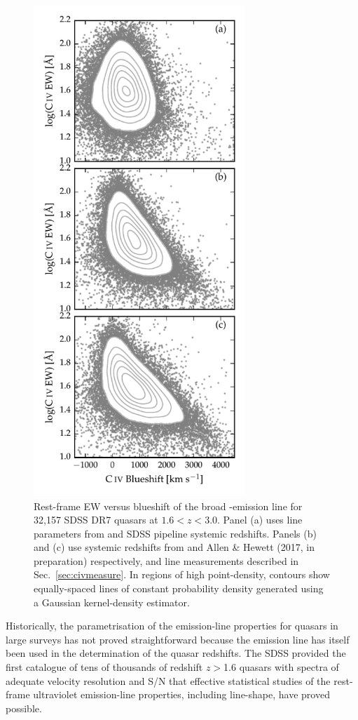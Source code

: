 \begin{figure}
    \includegraphics[width=8cm]{figures/chapter02/civ_space.pdf}
    \caption{Rest-frame EW versus blueshift of the broad -emission line for 32,157 SDSS DR7 quasars at $1.6 < z < 3.0$. Panel (a) uses  line parameters from \citet{shen11} and SDSS pipeline systemic redshifts. Panels (b) and (c) use systemic redshifts from \citet{hewett10} and Allen \& Hewett (2017, in preparation) respectively, and  line measurements described in Sec.~\ref{sec:civmeasure}. In regions of high point-density, contours show equally-spaced lines of constant probability density generated using a Gaussian kernel-density estimator.} 
    \label{fig:civ_space}
\end{figure}

Historically, the parametrisation of the  emission-line properties for quasars in large surveys has not proved straightforward because the  emission line has itself been used in the determination of the quasar redshifts. 
The SDSS provided the first catalogue of tens of thousands of redshift $z>$1.6 quasars with spectra of adequate velocity resolution and S/N that effective statistical studies of the rest-frame ultraviolet emission-line properties, including line-shape, have proved possible.


